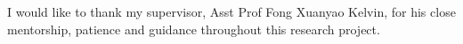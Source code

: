 \begin{acknowledgments}

    I would like to thank my supervisor, Asst Prof Fong Xuanyao Kelvin, for his close mentorship, patience and guidance throughout this research project.

\end{acknowledgments}
